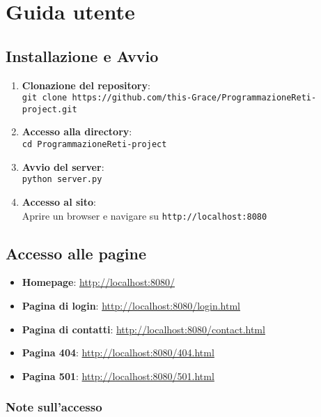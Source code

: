 \documentclass[a4paper,12pt]{report}
\begin{document}
\chapter{Guida utente}

\section{Installazione e Avvio}

\begin{enumerate}
    \item \textbf{Clonazione del repository}:\\
    \texttt{git clone https://github.com/this-Grace/ProgrammazioneReti-project.git}

    \item \textbf{Accesso alla directory}:\\
    \texttt{cd ProgrammazioneReti-project}

    \item \textbf{Avvio del server}:\\
    \texttt{python server.py}

    \item \textbf{Accesso al sito}:\\
    Aprire un browser e navigare su \texttt{http://localhost:8080}
\end{enumerate}

\section{Accesso alle pagine}

\begin{itemize}
    \item \textbf{Homepage}: \url{http://localhost:8080/}
    \item \textbf{Pagina di login}: \url{http://localhost:8080/login.html}
    \item \textbf{Pagina di contatti}: \url{http://localhost:8080/contact.html}
    \item \textbf{Pagina 404}: \url{http://localhost:8080/404.html}
    \item \textbf{Pagina 501}: \url{http://localhost:8080/501.html}
\end{itemize}

\subsection{Note sull'accesso}
\end{document}
